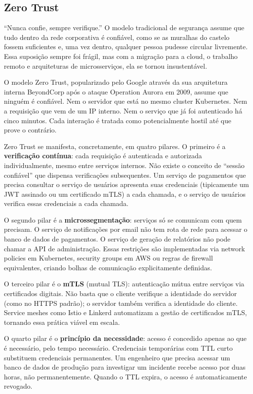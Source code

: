 \subsection{Zero Trust}

``Nunca confie, sempre verifique.'' O modelo tradicional de segurança assume que
tudo dentro da rede corporativa é confiável, como se as muralhas do castelo
fossem suficientes e, uma vez dentro, qualquer pessoa pudesse circular livremente.
Essa suposição sempre foi frágil, mas com a migração para a cloud, o trabalho
remoto e arquiteturas de microsserviços, ela se tornou insustentável.

O modelo Zero Trust, popularizado pelo Google através da sua arquitetura interna
BeyondCorp após o ataque Operation Aurora em 2009, assume que ninguém é
confiável. Nem o servidor que está no mesmo cluster Kubernetes. Nem a requisição
que vem de um IP interno. Nem o serviço que já foi autenticado há cinco minutos.
Cada interação é tratada como potencialmente hostil até que prove o contrário.

Zero Trust se manifesta, concretamente, em quatro pilares. O primeiro
é a \textbf{verificação contínua}: cada requisição é autenticada e autorizada
individualmente, mesmo entre serviços internos. Não existe o conceito de
``sessão confiável'' que dispensa verificações subsequentes. Um serviço de
pagamentos que precisa consultar o serviço de usuários apresenta suas credenciais
(tipicamente um JWT assinado ou um certificado mTLS) a cada chamada, e o
serviço de usuários verifica essas credenciais a cada chamada.

O segundo pilar é a \textbf{microssegmentação}: serviços só se comunicam com
quem precisam. O serviço de notificações por email não tem rota de rede para
acessar o banco de dados de pagamentos. O serviço de geração de relatórios não
pode chamar a API de administração. Essas restrições são implementadas via
network policies em Kubernetes, security groups em AWS ou regras de firewall
equivalentes, criando bolhas de comunicação explicitamente definidas.

O terceiro pilar é o \textbf{mTLS} (mutual TLS): autenticação mútua entre
serviços via certificados digitais. Não basta que o cliente verifique a
identidade do servidor (como no HTTPS padrão); o servidor também verifica a
identidade do cliente. Service meshes como Istio e Linkerd automatizam a gestão
de certificados mTLS, tornando essa prática viável em escala.

O quarto pilar é o \textbf{princípio da necessidade}: acesso é concedido apenas
ao que é necessário, pelo tempo necessário. Credenciais temporárias com TTL curto
substituem credenciais permanentes. Um engenheiro que precisa acessar um banco de
dados de produção para investigar um incidente recebe acesso por duas horas, não
permanentemente. Quando o TTL expira, o acesso é automaticamente revogado.


